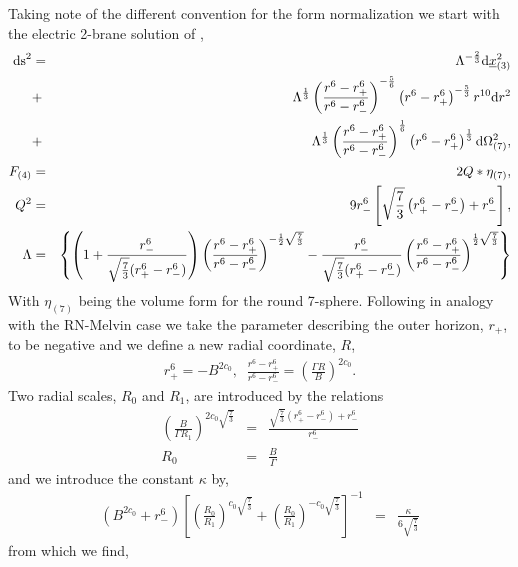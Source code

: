 \documentclass[a4paper,11pt]{article}
\begin{document}
Taking note of the different convention for the form normalization we
start with the electric 2-brane solution of \cite{gregory96},
\begin{eqnarray}
{\rm ds}^2&=&
\Lambda^{-\frac{2}{3}}{\rm d}\underline{x}_{(3)}^2\\
\nonumber
&+&
\Lambda^{\frac{1}{3}}
        \left(\frac{r^6-r_+^6}{r^6-r_-^6}\right)^{-\frac{5}{6}}
        \left(r^6-r_+^6\right)^{-\frac{5}{3}}
       r^{10}{\rm d}r^2\\
\nonumber
&+&
\Lambda^{\frac{1}{3}}
        \left(\frac{r^6-r_+^6}{r^6-r_-^6}\right)^{\frac{1}{6}}
        \left(r^6-r_+^6\right)^{\frac{1}{3}}
       {\rm d}\Omega^2_{(7)},\\
F_{(4)}&=&2Q*\eta_{(7)},\\
Q^2&=&9r_-^6\left[\sqrt{\frac{7}{3}}\left(r_+^6-r_-^6\right)+r_-^6\right],\\
\Lambda&=&\left\{\left(1+\frac{r_-^6}{\sqrt{\frac{7}{3}}(r_+^6-r_-^6)}\right)
      \left(\frac{r^6-r_+^6}{r^6-r_-^6}\right)^{-\frac{1}{2}\sqrt{\frac{7}{3}}}
      -\frac{r_-^6}{\sqrt{\frac{7}{3}}(r_+^6-r_-^6)}
      \left(\frac{r^6-r_+^6}{r^6-r_-^6}\right)^{\frac{1}{2}\sqrt{\frac{7}{3}}}
\right\}
\end{eqnarray}
With $\eta_{(7)}$ being the volume form for the round 7-sphere.
Following in analogy with the RN-Melvin case we take the parameter describing
the outer horizon, $r_+$, to be negative and we define a new radial coordinate,
$R$,
\begin{eqnarray}
r_+^6=-B^{2c_0},\;\;
\frac{r^6-r_+^6}{r^6-r_-^6}=\left(\frac{\Gamma R}{B}\right)^{2c_0}.
\end{eqnarray}
Two radial scales, $R_0$ and $R_1$, are introduced by the relations
\begin{eqnarray}
\left(\frac{B}{\Gamma R_1}\right)^{2c_0\sqrt{\frac{7}{3}}}
&=&\frac{\sqrt{\frac{7}{3}}\left(r_+^6-r_-^6\right)+r_-^6}{r_-^6}\\
R_0&=&\frac{B}{\Gamma}
\end{eqnarray}
and we introduce the constant $\kappa$ by,
\begin{eqnarray}
\left(B^{2c_0}+r_-^6\right)\left[ \left(\frac{R_0}{R_1}\right)^{c_0\sqrt{\frac{7}{3}}}
                   +\left(\frac{R_0}{R_1}\right)^{-c_0\sqrt{\frac{7}{3}}}\right]^{-1}
&=&\frac{\kappa}{6\sqrt{\frac{7}{3}}}
\end{eqnarray}
from which we find,
\end{document}
